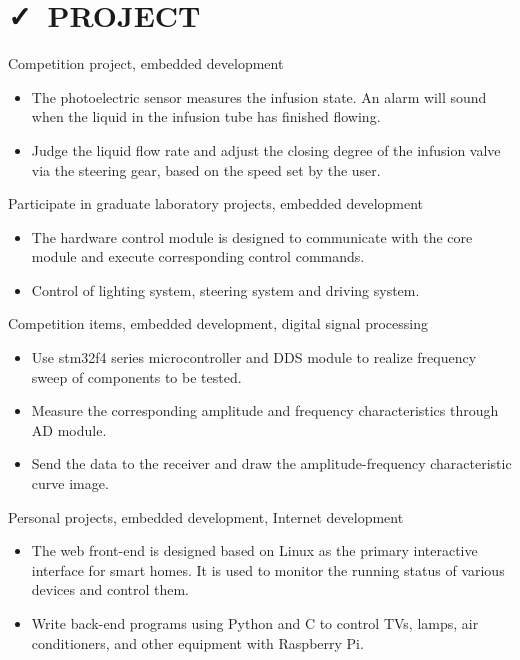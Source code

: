 \documentclass{resume}
\begin{document}
\section{\faCheck\ PROJECT}
Competition project, embedded development
\begin{itemize}
  \item The photoelectric sensor measures the infusion state. An alarm will sound when the liquid in the infusion tube has finished flowing.
  \item Judge the liquid flow rate and adjust the closing degree of the infusion valve via the steering gear, based on the speed set by the user.
\end{itemize}
 
Participate in graduate laboratory projects, embedded development
\begin{itemize}
  \item The hardware control module is designed to communicate with the core module and execute corresponding control commands.
  \item Control of lighting system, steering system and driving system.
\end{itemize}
 
Competition items, embedded development, digital signal processing
\begin{itemize}
  \item Use stm32f4 series microcontroller and DDS module to realize frequency sweep of components to be tested.
  \item Measure the corresponding amplitude and frequency characteristics through AD module.
  \item Send the data to the receiver and draw the amplitude-frequency characteristic curve image.
\end{itemize}
 
Personal projects, embedded development, Internet development
\begin{itemize}
  \item The web front-end is designed based on Linux as the primary interactive interface for smart homes. It is used to monitor the running status of various devices and control them.
  \item Write back-end programs using Python and C to control TVs, lamps, air conditioners, and other equipment with Raspberry Pi.
\end{itemize}
 
\end{document}
